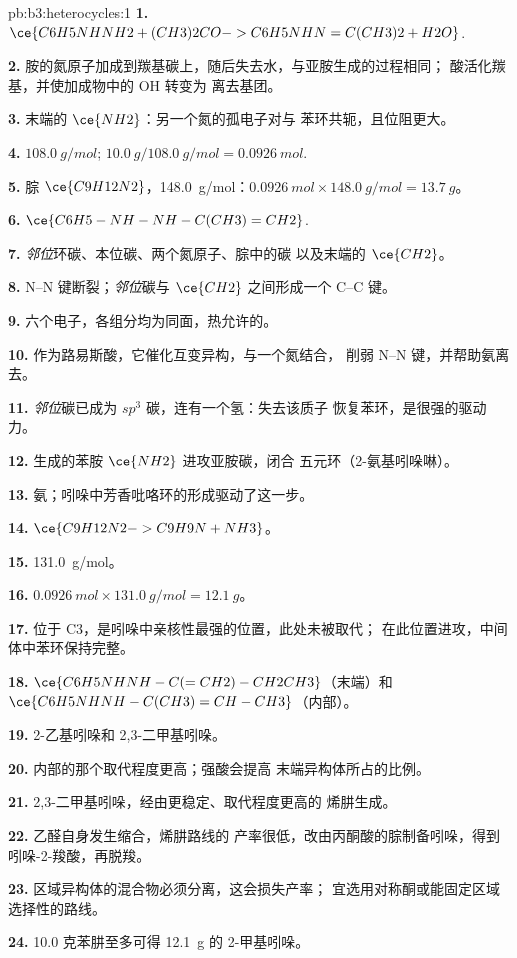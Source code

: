 \begin{solution}{pb:b3:heterocycles:1}
\textbf{1.} $\ce{C6H5NHNH2 + (CH3)2CO -> C6H5NHN=C(CH3)2 + H2O}$.

\textbf{2.} 胺的氮原子加成到羰基碳上，随后失去水，与亚胺生成的过程相同；
酸活化羰基，并使加成物中的 OH 转变为
离去基团。

\textbf{3.} 末端的 $\ce{NH2}$：另一个氮的孤电子对与
苯环共轭，且位阻更大。

\textbf{4.} $\qty{108.0}{g/mol}$; $\qty{10.0}{g}/\qty{108.0}{g/mol} = \qty{0.0926}{mol}$.

\textbf{5.} 腙 $\ce{C9H12N2}$，\qty{148.0}{g/mol}：$\qty{0.0926}{mol} \times \qty{148.0}{g/mol} = \qty{13.7}{g}$。

\textbf{6.} $\ce{C6H5-NH-NH-C(CH3)=CH2}$.

\textbf{7.} \textit{邻位}环碳、本位碳、两个氮原子、腙中的碳
以及末端的 $\ce{CH2}$。

\textbf{8.} N--N 键断裂；\textit{邻位}碳与 $\ce{CH2}$ 之间形成一个 C--C 键。

\textbf{9.} 六个电子，各组分均为同面，热允许的。

\textbf{10.} 作为路易斯酸，它催化互变异构，与一个氮结合，
削弱 N--N 键，并帮助氨离去。

\textbf{11.} \textit{邻位}碳已成为 $sp^3$ 碳，连有一个氢：失去该质子
恢复苯环，是很强的驱动力。

\textbf{12.} 生成的苯胺 $\ce{NH2}$ 进攻亚胺碳，闭合
五元环（2-氨基吲哚啉）。

\textbf{13.} 氨；吲哚中芳香吡咯环的形成驱动了这一步。

\textbf{14.} $\ce{C9H12N2 -> C9H9N + NH3}$。

\textbf{15.} \qty{131.0}{g/mol}。

\textbf{16.} $\qty{0.0926}{mol} \times \qty{131.0}{g/mol} = \qty{12.1}{g}$。

\textbf{17.} 位于 C3，是吲哚中亲核性最强的位置，此处未被取代；
在此位置进攻，中间体中苯环保持完整。

\textbf{18.} $\ce{C6H5NHNH-C(=CH2)-CH2CH3}$（末端）和 $\ce{C6H5NHNH-C(CH3)=CH-CH3}$（内部）。

\textbf{19.} 2-乙基吲哚和 2,3-二甲基吲哚。

\textbf{20.} 内部的那个取代程度更高；强酸会提高
末端异构体所占的比例。

\textbf{21.} 2,3-二甲基吲哚，经由更稳定、取代程度更高的
烯肼生成。

\textbf{22.} 乙醛自身发生缩合，烯肼路线的
产率很低，改由丙酮酸的腙制备吲哚，得到
吲哚-2-羧酸，再脱羧。

\textbf{23.} 区域异构体的混合物必须分离，这会损失产率；
宜选用对称酮或能固定区域选择性的路线。

\textbf{24.} 10.0 克苯肼至多可得 \qty{12.1}{g} 的 2-甲基吲哚。
\end{solution}
